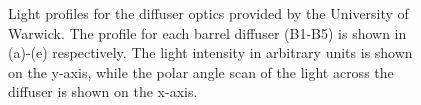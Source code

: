 \begin{figure}[!htbp]
    \centering
    
    \caption{Light profiles for the diffuser optics provided by the University of Warwick. The profile for each barrel diffuser (B1-B5) is shown in (a)-(e) respectively. The light intensity in arbitrary units is shown on the y-axis, while the polar angle scan of the light across the diffuser is shown on the x-axis.}\label{fig:diffuser_TF1}
    
    \hfill
    \par
    \hfill
    \par
    
\end{figure}






